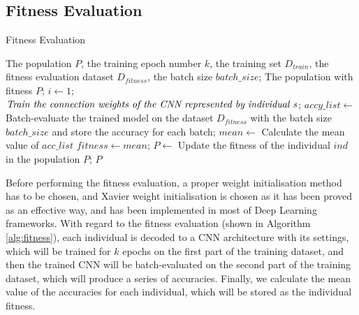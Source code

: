 \documentclass[conference]{IEEEtran}
\begin{document}
\subsection{Fitness Evaluation}
\begin{algorithm}
	\caption{Fitness Evaluation}
	\label{alg:fitness}
	\begin{algorithmic}
		\renewcommand{\algorithmicrequire}{\textbf{Input:}}
		\renewcommand{\algorithmicensure}{\textbf{Output:}}
		\REQUIRE The population $P$, the training epoch number $k$, the training set $D_{train}$, the fitness evaluation dataset $D_{fitness}$, the batch size $batch\_size$;
		\ENSURE The population with fitness $P$;
			\STATE $i \leftarrow 1$;
				\STATE $\textit{Train the connection weights of the CNN } \newline \textit{represented by individual s}$;
			\ENDWHILE
			\STATE $accy\_list \leftarrow$ Batch-evaluate the trained model on the dataset $D_{fitness}$ with the batch size $batch\_size$ and store the accuracy for each batch;
			\STATE $mean \leftarrow$ Calculate the mean value of  $acc\_list$
			\STATE $fitness \leftarrow mean$;
			\STATE $P \leftarrow$ Update the fitness of the individual $ind$ in the population $P$;
		\ENDFOR	
		\RETURN $P$	
	\end{algorithmic}
\end{algorithm}

Before performing the fitness evaluation, a proper weight initialisation method has to be chosen, and Xavier weight initialisation \cite{WeightIniti:Glorot} is chosen as it has been proved as an effective way, and has been implemented in most of Deep Learning frameworks. With regard to the fitness evaluation (shown in Algorithm \ref{alg:fitness}), each individual is decoded to a CNN architecture with its settings, which will be trained for $k$ epochs on the first part of the training dataset, and then the trained CNN will be batch-evaluated on the second part of the training dataset, which will produce a series of accuracies. Finally, we calculate the mean value of the accuracies for each individual, which will be stored as the individual fitness. 
\end{document}
